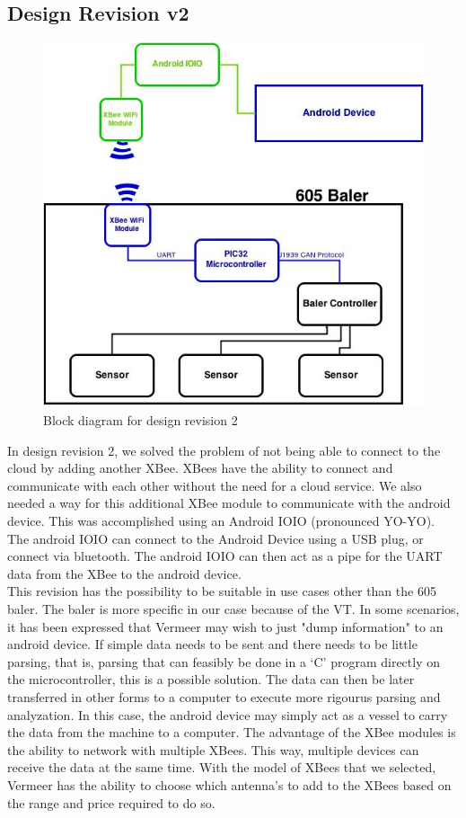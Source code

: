 \documentclass[paper=a4, fontsize=11pt]{scrartcl}
\numberwithin{equation}{section}		%
\numberwithin{figure}{section}			%
\numberwithin{table}{section}				%
\begin{document}
\subsection{Design Revision v2} 
 \begin{figure}[ht]
	 \center\includegraphics[scale=0.5]{rev2.jpg}
 \caption{Block diagram for design revision 2}
 \end{figure}
In design revision 2, we solved the problem of not being able to connect to the cloud by adding another XBee. XBees have the ability to connect and communicate with each other without the need for a cloud service. We also needed a way for this additional XBee module to communicate with the android device. This was accomplished using an Android IOIO (pronounced YO-YO). The android IOIO can connect to the Android Device using a USB plug, or connect via bluetooth. The android IOIO can then act as a pipe for the UART data from the XBee to the android device. \\

This revision has the possibility to be suitable in use cases other than the 605 baler. The baler is more specific in our case because of the VT. In some scenarios, it has been expressed that Vermeer may wish to just "dump information" to an android device. If simple data needs to be sent and there needs to be little parsing, that is, parsing that can feasibly be  done in a ‘C' program directly on the microcontroller, this is a possible solution. The data can then be later transferred in other forms to a computer to execute more rigourus parsing and analyzation. In this case, the android device may simply act as a vessel to carry the data from the machine to a computer. The advantage of the XBee modules is the ability to network with multiple XBees. This way, multiple devices can receive the data at the same time. With the model of XBees that we selected, Vermeer has the ability to choose which antenna's to add to the XBees based on the range and price required to do so. \\
\end{document}
